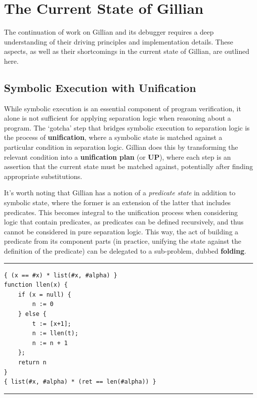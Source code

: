 
\chapter{The Current State of Gillian}\label{sec:current}

The continuation of work on Gillian and its debugger requires a deep
understanding of their driving principles and implementation details.
These aspects, as well as their shortcomings in the current state of Gillian,
are outlined here.

\section{Symbolic Execution with Unification}\label{sec:current:symex}


While symbolic execution is an essential component of program verification, it
alone is not sufficient for applying separation logic when reasoning about a
program. The `gotcha' step that bridges symbolic execution to separation logic
is the process of \textbf{unification}, where a symbolic state is matched
against a particular condition in separation logic. Gillian does this by
transforming the relevant condition into a \textbf{unification plan} (or
\textbf{UP}), where each step is an assertion that the current state must be
matched against, potentially after finding appropriate substitutions.

It's worth noting that Gillian has a notion of a \textit{predicate state} in
addition to symbolic state, where the former is an extension of the latter that
includes predicates. This becomes integral to the unification process when
considering logic that contain predicates, as predicates can be defined
recursively, and thus cannot be considered in pure separation logic. This way,
the act of building a predicate from its component parts (in practice, unifying
the state against the definition of the predicate) can be delegated to a
sub-problem, dubbed \textbf{folding}.

\begin{listing}[!ht]
\noindent\rule{\textwidth}{0.5pt}
\vspace{-0.6cm}
\begin{verbatim}
{ (x == #x) * list(#x, #alpha) }
function llen(x) {
    if (x = null) {
        n := 0
    } else {
        t := [x+1];
        n := llen(t);
        n := n + 1
    };
    return n
}
{ list(#x, #alpha) * (ret == len(#alpha)) }
\end{verbatim}
\vspace{-0.4cm}
\noindent\rule{\textwidth}{0.5pt}
\vspace{-0.6cm}
\caption{The recursive list length function, in WISL}
\label{lst:llen-rec}
\end{listing}

